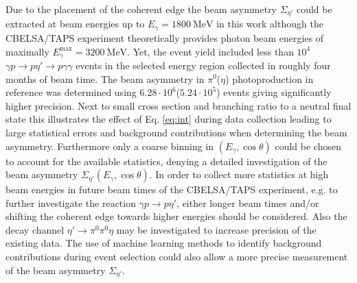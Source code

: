 Due to the placement of the coherent edge the beam asymmetry $\Sigma_{\eta'}$ could be extracted at beam energies up to $E_\gamma=\SI{1800}{\mega\eV}$ in this work although the CBELSA/TAPS experiment theoretically provides photon beam energies of maximally $E_\gamma^\text{max}=\SI{3200}{\mega\eV}$. Yet, the event yield included less than $10^4$ $\gamma p\to p\eta'\to p\gamma\gamma$ events in the selected energy region collected in roughly four months of beam time. The beam asymmetry in $\pi^0$($\eta$) photoproduction in reference \cite{farahphd} was determined using $6.28\cdot10^6$($5.24\cdot10^5$) events giving significantly higher precision. Next to small cross section and branching ratio to a neutral final state this illustrates the effect of Eq. \ref{eq:int} during data collection leading to large statistical errors and background contributions when determining the beam asymmetry. Furthermore only a coarse binning in $\left(E_\gamma,\cos\theta\right)$ could be chosen to account for the available statistics, denying a detailed investigation of the beam asymmetry $\Sigma_{\eta'}\left(E_\gamma,\cos\theta\right)$. In order to collect more statistics at high beam energies in future beam times of the CBELSA/TAPS experiment, e.g. to further investigate the reaction $\gamma p\to p\eta'$, either longer beam times and/or shifting the coherent edge towards higher energies should be considered. Also the decay channel $\eta'\to\pi^0\pi^0\eta$ may be investigated to increase precision of the existing data. The use of machine learning methods to identify background contributions during event selection \cite{ml} could also allow a more precise measurement of the beam asymmetry $\Sigma_{\eta'}$.
